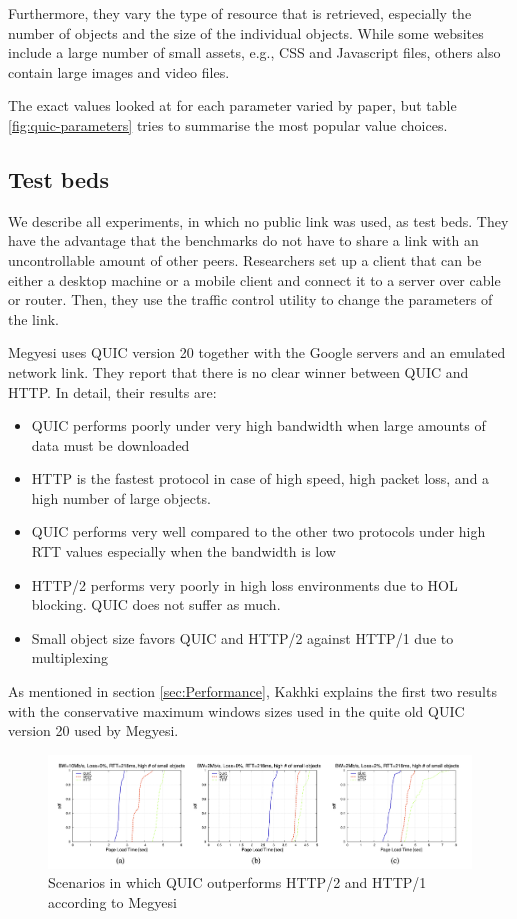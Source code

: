 \documentclass[conference]{IEEEtran}
\begin{document}
Furthermore, they vary the type of resource that is retrieved, especially the number of objects and the size of the individual objects. While some websites include a large number of small assets, e.g., CSS and Javascript files, others also contain large images and video files.

The exact values looked at for each parameter varied by paper, but table \ref{fig:quic-parameters} tries to summarise the most popular value choices.


\subsection{Test beds}

We describe all experiments, in which no public link was used, as test beds. They have the advantage that the benchmarks do not have to share a link with an uncontrollable amount of other peers. Researchers set up a client that can be either a desktop machine or a mobile client and connect it to a server over cable or router. Then, they use the traffic control utility to change the parameters of the link. 

Megyesi \cite{HowQuickIsQuic} uses QUIC version 20 together with the Google servers and an emulated network link. They report that there is no clear winner between QUIC and HTTP. In detail, their results are:

\begin{itemize}
\item QUIC performs poorly under very high bandwidth when large amounts of data must be downloaded
\item HTTP is the fastest protocol in case of high speed, high packet loss, and a high number of large objects.
\item QUIC performs very well compared to the other two protocols under high RTT values especially when the bandwidth is low
\item HTTP/2 performs very poorly in high loss environments due to HOL blocking. QUIC does not suffer as much.
\item Small object size favors QUIC and HTTP/2 against HTTP/1 due to multiplexing
\end{itemize} 

As mentioned in section \ref{sec:Performance}, Kakhki explains the first two results with the conservative maximum windows sizes used in the quite old QUIC version 20 used by Megyesi.

\begin{figure}[htbp]
\centerline{\includegraphics[width=\textwidth]{images/Megyesi QUIC wins.png}}
\caption{Scenarios in which QUIC outperforms HTTP/2 and HTTP/1 according to Megyesi \cite{HowQuickIsQuic}}
\label{fig:megyesi-quic-wins}
\end{figure} 
\end{document}
